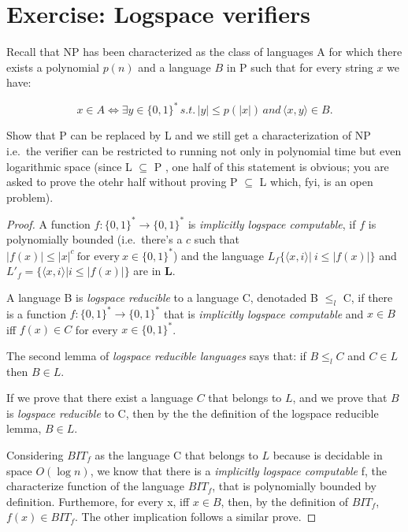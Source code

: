 \documentclass[12pt, a4paper]{article}
\begin{document}
\section{Exercise: Logspace verifiers}

Recall that NP has been characterized as the class of languages A for which there exists a polynomial $p(n)$ and a language $B$ in P such that for every string $x$ we have:

\[
  x \in A \Leftrightarrow \exists y \in \{ 0 , 1 \} ^ * \, s.t. \, |y| \leq p(|x|) \, and \, \langle x, y \rangle \in B.
\]

Show that P can be replaced by L and we still get a characterization of NP\; i.e.\ the verifier can be restricted to running not only in polynomial time but even logarithmic space (since L $\subseteq$ P , one half of this statement is obvious; you are asked to prove the otehr half without proving P $\subseteq$ L which, fyi, is an open problem).

\begin{proof}

  A function $f : \{ 0 , 1 \} ^* \to \{ 0 , 1 \} ^*$ is \textit{implicitly logspace computable}, if $f$ is polynomially bounded (i.e.\, there's a $c$ such that $|f(x)| \leq |x|^c\ \text{for every}\ x \in \{ 0 , 1 \} ^*$) and the language $L_f \{ \langle x, i \rangle | \ i \leq |f(x)|\}$ and $L'_f = \{ \langle x, i \rangle | i \leq |f(x)| \}$ are in \textbf{L}.


  A language B is \textit{logspace reducible} to a language C, denotaded B $\leq_l$ C, if there is a function $f : \{ 0 , 1 \} ^* \to \{ 0 , 1 \} ^*$  that is \textit{implicitly logspace computable} and $x \in B$ iff $f(x) \in C$ for every $x \in \{ 0 , 1 \} ^*$.


  The second lemma of \textit{logspace reducible languages} says that: if $B \leq_l C$  and $C \in L$ then $B \in L$.


  If we prove that there exist a language $C$ that belongs to $L$, and we prove that $B$ is \textit{logspace reducible} to C, then by the the definition of the logspace reducible lemma, $B \in L$.


  Considering $BIT_f$ as the language C that belongs to $L$ because is decidable in space $O(\log n)$, we know that there is a \textit{implicitly  logspace computable} f, the characterize function of the language $BIT_f$, that is polynomially bounded by definition. Furthemore, for every x, iff $x \in B$, then, by the definition of $BIT_f$, $f(x) \in BIT_f$. The other implication follows a similar prove.



\end{proof}
\end{document}
